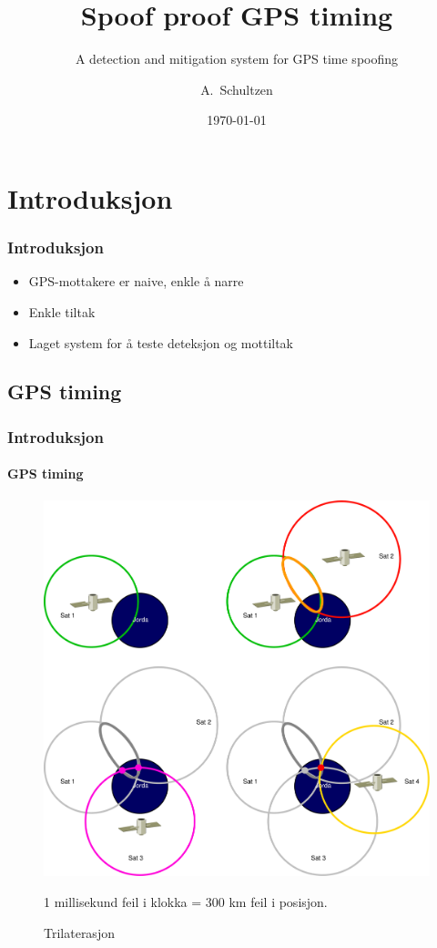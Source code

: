 \documentclass[xcolor=table]{beamer}
\title[Spoof proof GPS timing] %
{Spoof proof GPS timing}
\subtitle{A detection and mitigation system for GPS time spoofing}
\author[A. Schultzen] %
{A.~Schultzen\inst{1}}
\institute[Universities Here and There] %
{
  \inst{1}%
  Institutt for informatikk\\
  Universitetet i Oslo
}
\date{\today}
\begin{document}
\frame{\titlepage}

\section{Introduksjon}
\begin{frame}
  \frametitle{Introduksjon}
  \begin{itemize}
    \setlength\itemsep{2em}
    \item GPS-mottakere er naive, enkle å narre
    \item Enkle tiltak
    \item Laget system for å teste deteksjon og mottiltak
\end{itemize}
\end{frame}

\subsection{GPS timing}
\begin{frame}
  \frametitle{Introduksjon}
\framesubtitle{GPS timing} 
  \begin{figure}
  \vspace{-30pt}
      \includegraphics[scale=0.15]{thesis/graphics/trilaterate.pdf}
      \caption{Trilaterasjon}
      1 millisekund feil i klokka = 300 km feil i posisjon.
    \end{figure}
\end{frame}
\end{document}
